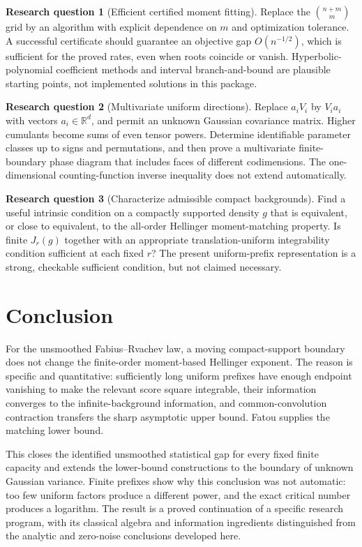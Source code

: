 \documentclass[11pt,a4paper]{article}
\numberwithin{equation}{section}
\theoremstyle{definition}
\newtheorem{question}{Research question}
\theoremstyle{remark}
\newcommand{\R}{\mathbb R}
\begin{document}
\begin{question}[Efficient certified moment fitting]
Replace the $\binom{n+m}{m}$ grid by an algorithm with explicit dependence
on $m$ and optimization tolerance. A successful certificate should guarantee
an objective gap $O(n^{-1/2})$, which is sufficient for the proved rates,
even when roots coincide or vanish. Hyperbolic-polynomial coefficient
methods and interval branch-and-bound are plausible starting points, not
implemented solutions in this package.
\end{question}

\begin{question}[Multivariate uniform directions]
Replace $a_iV_i$ by $V_i a_i$ with vectors $a_i\in\R^d$, and permit an
unknown Gaussian covariance matrix. Higher cumulants become sums of even
tensor powers. Determine identifiable parameter classes up to signs and
permutations, and then prove a multivariate finite-boundary phase diagram
that includes faces of different codimensions. The one-dimensional
counting-function inverse inequality does not extend automatically.
\end{question}

\begin{question}[Characterize admissible compact backgrounds]
Find a useful intrinsic condition on a compactly supported density $g$
that is equivalent, or close to equivalent, to the all-order Hellinger
moment-matching property. Is finite $J_r(g)$ together with an appropriate
translation-uniform integrability condition sufficient at each fixed $r$?
The present uniform-prefix representation is a strong, checkable sufficient
condition, but not claimed necessary.
\end{question}

\section{Conclusion}

For the unsmoothed Fabius--Rvachev law, a moving compact-support boundary
does not change the finite-order moment-based Hellinger exponent. The
reason is specific and quantitative: sufficiently long uniform prefixes
have enough endpoint vanishing to make the relevant score square
integrable, their information converges to the infinite-background
information, and common-convolution contraction transfers the sharp
asymptotic upper bound. Fatou supplies the matching lower bound.

This closes the identified unsmoothed statistical gap for every fixed
finite capacity and extends the lower-bound constructions to the boundary
of unknown Gaussian variance. Finite prefixes show why this conclusion
was not automatic: too few uniform factors produce a different power,
and the exact critical number produces a logarithm. The result is a
proved continuation of a specific research program, with its classical
algebra and information ingredients distinguished from the analytic and
zero-noise conclusions developed here.
\end{document}
